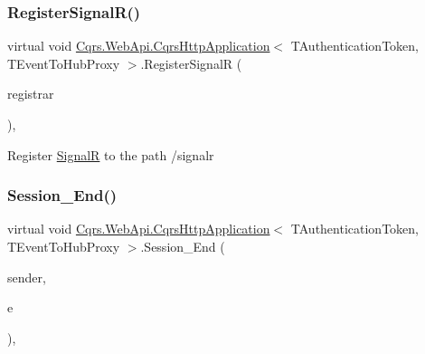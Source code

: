 \subsubsection{\texorpdfstring{Register\+Signal\+R()}{RegisterSignalR()}}
{\footnotesize\ttfamily virtual void \hyperlink{classCqrs_1_1WebApi_1_1CqrsHttpApplication}{Cqrs.\+Web\+Api.\+Cqrs\+Http\+Application}$<$ T\+Authentication\+Token, T\+Event\+To\+Hub\+Proxy $>$.Register\+SignalR (\begin{DoxyParamCaption}\item[{\hyperlink{classCqrs_1_1Configuration_1_1BusRegistrar}{Bus\+Registrar}}]{registrar }\end{DoxyParamCaption})\hspace{0.3cm}{\ttfamily [protected]}, {\ttfamily [virtual]}}



Register \hyperlink{namespaceCqrs_1_1WebApi_1_1SignalR}{SignalR} to the path /signalr 

\mbox{\label{classCqrs_1_1WebApi_1_1CqrsHttpApplication_a72e04b9b77ef87292801f8b65edace1e}} 
\subsubsection{\texorpdfstring{Session\+\_\+\+End()}{Session\_End()}}
{\footnotesize\ttfamily virtual void \hyperlink{classCqrs_1_1WebApi_1_1CqrsHttpApplication}{Cqrs.\+Web\+Api.\+Cqrs\+Http\+Application}$<$ T\+Authentication\+Token, T\+Event\+To\+Hub\+Proxy $>$.Session\+\_\+\+End (\begin{DoxyParamCaption}\item[{object}]{sender,  }\item[{Event\+Args}]{e }\end{DoxyParamCaption})\hspace{0.3cm}{\ttfamily [protected]}, {\ttfamily [virtual]}}

\mbox{\label{classCqrs_1_1WebApi_1_1CqrsHttpApplication_a51f539501f607c3ecae6530120c129eb}} 
